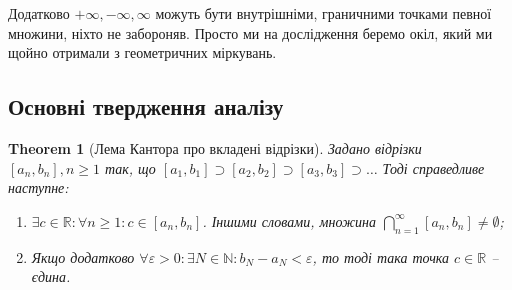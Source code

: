 \documentclass[a4paper, 14pt]{article}
\theoremstyle{theoremdd}
\newtheorem{theorem}{Theorem}[subsection]
\theoremstyle{theoremdd}
\theoremstyle{theoremdd}
\theoremstyle{theoremdd}
\theoremstyle{theoremdd}
\theoremstyle{theoremdd}
\theoremstyle{theoremdd}
\theoremstyle{theoremdd}
\begin{document}
	Додатково $+\infty, -\infty, \infty$ можуть бути внутрішніми, граничними точками певної множини, ніхто не забороняв. Просто ми на дослідження беремо окіл, який ми щойно отримали з геометричних міркувань.
	
	\subsection{Основні твердження аналізу}
	\begin{theorem}[Лема Кантора про вкладені відрізки]
	Задано відрізки $[a_n,b_n], n \geq 1$ так, що $[a_1,b_1] \supset [a_2,b_2] \supset [a_3,b_3] \supset \dots$ Тоді справедливе наступне:
	\begin{enumerate}[nosep,wide=0pt,label={\arabic*)}]
	\item $\exists c \in \mathbb{R}: \forall n \geq 1: c \in [a_n,b_n]$. Іншими словами, множина $\displaystyle\bigcap_{n=1}^\infty [a_n,b_n] \neq \emptyset$;
	\item Якщо додатково $\forall \varepsilon > 0: \exists N \in \mathbb{N}: b_N - a_N < \varepsilon$, то тоді така точка $c \in \mathbb{R}$ -- єдина.
	\end{enumerate}
	\begin{figure}[H]
	\centering
	\end{figure}
	\end{theorem}
	
\end{document}
